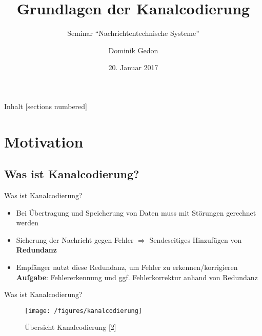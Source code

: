 \documentclass[ngerman]{beamer}
\title[Grundlagen der Kanalcodierung]{Grundlagen der Kanalcodierung}
\subtitle{Seminar ``Nachrichtentechnische Systeme''}
\author{Dominik Gedon}
\date{20. Januar 2017}
\begin{document}
\maketitle

	\begin{frame}[plain]{Inhalt}
		[sections numbered]
		\tableofcontents[hideallsubsections]
	\end{frame}


\section{Motivation}
\subsection{Was ist Kanalcodierung?}
\begin{frame}{Was ist Kanalcodierung?}
	\begin{itemize}
		\item Bei Übertragung und Speicherung von Daten muss mit \alert{Störungen} gerechnet werden \newline
		\item Sicherung der Nachricht gegen \alert{Fehler}\newline\newline
		 $\Longrightarrow$ Sendeseitiges Hinzufügen von \textbf{\alert{Redundanz}}\newline
		\item Empfänger nutzt diese Redundanz, um Fehler zu erkennen/korrigieren \newline\newline
		\textbf{Aufgabe}: \alert{Fehlererkennung} und ggf. \alert{Fehlerkorrektur} anhand von Redundanz
\end{itemize}
\end{frame}

\begin{frame}{Was ist Kanalcodierung?}

	\begin{figure}[htbp]
 	 	\centering
 		\texttt{[image: /figures/kanalcodierung]}
 		\caption {Übersicht Kanalcodierung [2]}
	\end{figure}
\end{frame}
\end{document}
